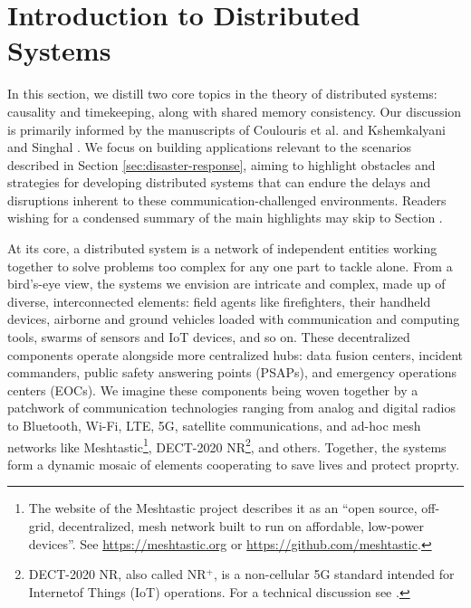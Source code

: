 \documentclass[]             %
{NASA}                       %
\theoremstyle{definition}
\begin{document}
\section{Introduction to Distributed Systems}
\label{sec:background}
In this section, we distill two core topics in the theory of
distributed systems: causality and timekeeping, along with shared
memory consistency.  Our discussion is primarily informed by the
manuscripts of Coulouris et al.  \cite{coulouris2005distributed} and
Kshemkalyani and Singhal \cite{kshemkalyani_singhal_2008}. We focus on
building applications relevant to the scenarios described in Section
\ref{sec:disaster-response}, aiming to highlight obstacles and
strategies for developing distributed systems that can endure the
delays and disruptions inherent to these communication-challenged
environments. Readers wishing for a condensed summary of the main
highlights may skip to Section \label{ssec:background-summary}.

At its core, a distributed system is a network of independent entities
working together to solve problems too complex for any one part to
tackle alone. From a bird’s-eye view, the systems we envision are
intricate and complex, made up of diverse, interconnected elements:
field agents like firefighters, their handheld devices, airborne and
ground vehicles loaded with communication and computing tools, swarms
of sensors and IoT devices, and so on. These decentralized components
operate alongside more centralized hubs: data fusion centers, incident
commanders, public safety answering points (PSAPs), and emergency
operations centers (EOCs). We imagine these components being woven
together by a patchwork of communication technologies ranging from
analog and digital radios to Bluetooth, Wi-Fi, LTE, 5G, satellite
communications, and ad-hoc mesh networks like
Meshtastic\footnote{The website of the
  Meshtastic project describes it as an ``open source, off-grid,
  decentralized, mesh network built to run on affordable, low-power
  devices''. See \url{https://meshtastic.org} or
  \url{https://github.com/meshtastic}.}, DECT-2020
NR\footnote{DECT-2020 NR, also called NR$^{+}$, is a non-cellular 5G
  standard intended for Internetof Things (IoT) operations. For a
  technical discussion see \cite{2022:dect-2020-nr}.}, and
others. Together, the systems form a dynamic mosaic of elements
cooperating to save lives and protect proprty.
\end{document}
